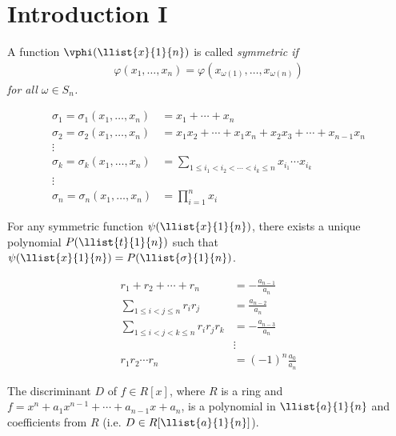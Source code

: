 \documentclass[a4paper]{article}
\begin{document}
\section{Introduction I}
\begin{tdefinition}
  A function \( \vphi(\llist{x}{1}{n}) \) is called \it{symmetric} if \begin{align*}
    \varphi(x_1,\ldots,x_n) = \varphi(x_{\omega(1)},\ldots,x_{\omega(n)})
  \end{align*}
  for all \( \omega\in S_n \).
\end{tdefinition}

\begin{tdefinition}
  \begin{align*}
    \sigma_1 = \sigma_1(x_1,\ldots,x_n) &= x_1+\cdots+x_n \\
    \sigma_2 = \sigma_2(x_1,\ldots,x_n) &= x_1x_2+\cdots+x_1x_n+x_2x_3+\cdots+x_{n-1}x_n \\
    \vdots \\
    \sigma_k = \sigma_k(x_1,\ldots,x_n)&=\sum\limits_{1\leq i_1<i_2<\cdots<i_k\leq n}x_{i_1}\cdots x_{i_k} \\
    \vdots \\
    \sigma_n = \sigma_n(x_1,\ldots,x_n)&=\prod\limits_{i=1}^n x_i
  \end{align*}
\end{tdefinition}

\begin{ttheorem}
  For any symmetric function \( \psi(\llist{x}{1}{n}) \), there exists a unique polynomial \( P(\llist{t}{1}{n}) \) such that \( \psi(\llist{x}{1}{n}) = P(\llist{\sigma}{1}{n}) \).
\end{ttheorem}

  \begin{align*}
  r_1 + r_2 + \cdots + r_n &= -\frac{a_{n-1}}{a_n} \\
  \sum_{1 \le i < j \le n} r_i r_j &= \frac{a_{n-2}}{a_n} \\
  \sum_{1 \le i < j < k \le n} r_i r_j r_k &= -\frac{a_{n-3}}{a_n} \\
  &\vdots \\
  r_1 r_2 \cdots r_n &= (-1)^n \frac{a_0}{a_n}
  \end{align*}

\begin{tcorollary}
  The discriminant \( D \) of \( f\in R[x] \), where \( R \) is a ring and \( f= x^n+a_1x^{n-1}+\cdots + a_{n-1}x+a_n\), is a polynomial in \( \llist{a}{1}{n} \) and coefficients from \( R \) (i.e. \( D \in R[\llist{a}{1}{n}] \)).
\end{tcorollary}
\end{document}
